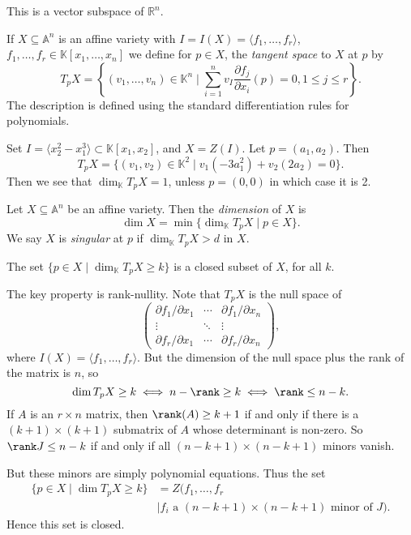 \documentclass[12pt]{article}
\begin{document}
This is a vector subspace of $\mathbb{R}^n$.

\begin{definition}
	If $X \subseteq \mathbb{A}^n$ is an affine variety with $I = I(X) = \langle f_1, \ldots, f_r \rangle$, $f_1, \ldots, f_r \in \mathbb{K}[x_1, \ldots, x_n]$ we define for $p \in X$, the \emph{tangent space} to $X$ at $p$ by
	\[
		T_p X = \left\{ (v_1, \ldots, v_n) \in \mathbb{K}^n \mid \sum_{i = 1}^n v_I \frac{\partial f_j}{\partial x_i}(p) = 0, 1 \leq j \leq r \right\}.
	\]
	The description is defined using the standard differentiation rules for polynomials.
\end{definition}

\begin{exbox}
	Set $I = \langle x_2^2 - x_1^3 \rangle \subset \mathbb{K}[x_1, x_2]$, and $X = Z(I)$. Let $p = (a_1, a_2)$. Then
	\[
		T_pX = \{(v_1, v_2) \in \mathbb{K}^2 \mid v_1(-3 a_1^2) + v_2(2 a_2) = 0 \}.
	\]
	Then we see that $\dim_{\mathbb{K}}T_p X = 1$, unless $p = (0, 0)$ in which case it is 2.
\end{exbox}

\begin{definition}
	Let $X \subseteq \mathbb{A}^n$ be an affine variety. Then the \emph{dimension} of $X$ is
	\[
		\dim X = \min \{ \dim_{\mathbb{K}} T_p X \mid p \in X\}.
	\]
	We say $X$ is \emph{singular} at $p$ if $\dim_{\mathbb{K}} T_p X > d$ in $X$.
\end{definition}

\begin{lemma}
	The set $\{ p \in X \mid \dim_{\mathbb{K}} T_p X \geq k\}$ is a closed subset of $X$, for all $k$.
\end{lemma}

\begin{proofbox}
	The key property is rank-nullity. Note that $T_p X$ is the null space of
	\[
		\begin{pmatrix}
			\partial f_1/ \partial x_1 & \cdots & \partial f_1/ \partial x_n \\
			\vdots & \ddots & \vdots \\
			\partial f_r / \partial x_1 & \cdots & \partial f_r / \partial x_n
		\end{pmatrix},
	\]
	where $I(X) = \langle f_1, \ldots, f_r \rangle$. But the dimension of the null space plus the rank of the matrix is $n$, so
	\[
	\dim T_p X \geq k \iff n - \rank \geq k \iff \rank \leq n - k.
	\]
	If $A$ is an $r \times n$ matrix, then $\rank(A) \geq k + 1$ if and only if there is a $(k+1) \times (k+1)$ submatrix of $A$ whose determinant is non-zero. So $\rank J \leq n - k$ if and only if all $(n - k + 1) \times (n - k + 1)$ minors vanish.

	But these minors are simply polynomial equations. Thus the set
	\begin{align*}
		\{ p \in X \mid \dim T_pX \geq k\} &= Z(f_1, \ldots, f_r \\
	&\mid f_i \text{ a $(n-k+1) \times (n-k+1)$ minor of } J).
	\end{align*}
	Hence this set is closed.
\end{proofbox}
\end{document}

